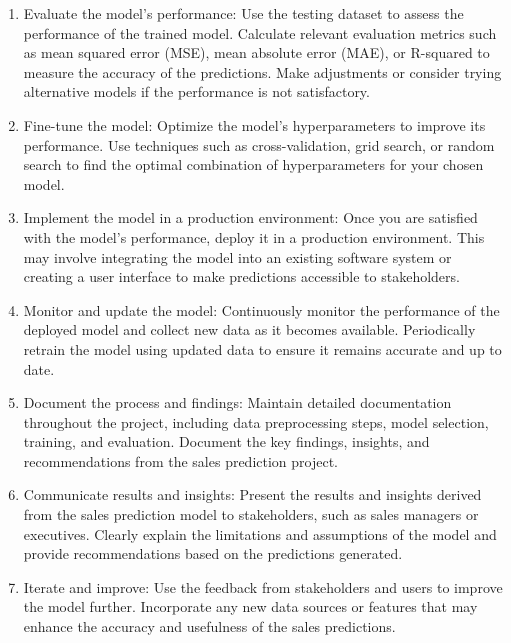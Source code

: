 \begin{enumerate}
		\item Evaluate the model's performance: Use the testing dataset to assess the performance of the trained model. Calculate relevant evaluation metrics such as mean squared error (MSE), mean absolute error (MAE), or R-squared to measure the accuracy of the predictions. Make adjustments or consider trying alternative models if the performance is not satisfactory.
		
		\item Fine-tune the model: Optimize the model's hyperparameters to improve its performance. Use techniques such as cross-validation, grid search, or random search to find the optimal combination of hyperparameters for your chosen model.
		
		\item Implement the model in a production environment: Once you are satisfied with the model's performance, deploy it in a production environment. This may involve integrating the model into an existing software system or creating a user interface to make predictions accessible to stakeholders.
		
		\item Monitor and update the model: Continuously monitor the performance of the deployed model and collect new data as it becomes available. Periodically retrain the model using updated data to ensure it remains accurate and up to date.
		
		\item Document the process and findings: Maintain detailed documentation throughout the project, including data preprocessing steps, model selection, training, and evaluation. Document the key findings, insights, and recommendations from the sales prediction project.
		
		\item Communicate results and insights: Present the results and insights derived from the sales prediction model to stakeholders, such as sales managers or executives. Clearly explain the limitations and assumptions of the model and provide recommendations based on the predictions generated.
		
		\item Iterate and improve: Use the feedback from stakeholders and users to improve the model further. Incorporate any new data sources or features that may enhance the accuracy and usefulness of the sales predictions.
	\end{enumerate}
	


